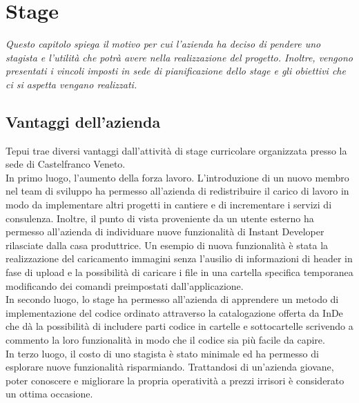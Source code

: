 \chapter{Stage}
\textit{Questo capitolo spiega il motivo per cui l'azienda ha deciso di pendere uno stagista e l'utilità che potrà avere nella realizzazione del progetto. Inoltre, vengono presentati i vincoli imposti in sede di pianificazione dello stage e gli obiettivi che ci si aspetta vengano realizzati.}

\section{Vantaggi dell'azienda}
Tepui trae diversi vantaggi dall'attività di stage curricolare organizzata presso la sede di Castelfranco Veneto.\\

In primo luogo, l'aumento della forza lavoro. L'introduzione di un nuovo membro nel team di sviluppo ha permesso all'azienda di redistribuire il carico di lavoro in modo da implementare altri progetti in cantiere e di incrementare i servizi di consulenza. Inoltre, il punto di vista proveniente da un utente esterno ha permesso all'azienda di individuare nuove funzionalità di Instant Developer rilasciate dalla casa produttrice.
Un esempio di nuova funzionalità è stata la realizzazione del caricamento immagini senza l'ausilio di informazioni di header in fase di upload e la possibilità di caricare i file in una cartella specifica temporanea modificando dei comandi preimpostati dall'applicazione.
\\

In secondo luogo, lo stage ha permesso all'azienda di apprendere un metodo di implementazione del codice ordinato attraverso la catalogazione offerta da InDe che dà la possibilità di includere parti codice in cartelle e sottocartelle scrivendo a commento la loro funzionalità in modo che il codice sia più facile da capire.
\\

In terzo luogo, il costo di uno stagista è stato minimale ed ha permesso di esplorare nuove funzionalità risparmiando. Trattandosi di un'azienda giovane, poter conoscere e migliorare la propria operatività a prezzi irrisori è considerato un ottima occasione. 


